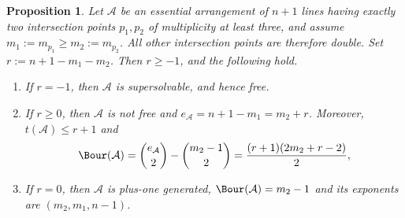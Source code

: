\documentclass[11pt]{amsart}   %
\newtheorem{Proposition}[Theorem]{Proposition}
\theoremstyle{definition}
\def\A{{\mathcal A}}
\begin{document}
\begin{Proposition}
\label{prop:two-multiple-points}
Let $\A$ be an essential arrangement of $n+1$ lines having exactly two intersection points $p_1,p_2$ of multiplicity at least three, and assume $m_1:=m_{p_1}\geq m_2:=m_{p_2}$. All other intersection points are therefore double. Set $r:=n+1-m_1-m_2$. Then $r\geq-1$, and the following hold.

\begin{enumerate}
\item If $r=-1$, then $\A$ is supersolvable, and hence free.

\item If $r\geq0$, then $\A$ is not free and
$e_\A=n+1-m_1=m_2+r$. Moreover, $t(\A)\leq r+1$ and
\[
\Bour(\A)
=
\binom{e_\A}{2}-\binom{m_2-1}{2}
=
\frac{(r+1)(2m_2+r-2)}{2},
\]
\item If $r=0$, then $\A$ is plus-one generated, $\Bour(\A)=m_2-1$ and its exponents are $(m_2,m_1,n-1)$.
\end{enumerate}
\end{Proposition}
\end{document}
